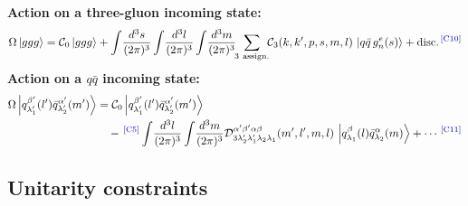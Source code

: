 \documentclass[11pt]{article}
\newcommand{\ip}[1]{\int\!\frac{d^{3}#1}{(2\pi)^{3}}}
\newcommand{\ket}[1]{\left|#1\right\rangle}
\newcommand{\OM}{\Omega}
\newcommand{\qk}[3]{q^{#1}_{#2}(#3)}
\newcommand{\aqk}[3]{\bar q^{#1}_{#2}(#3)}
\newcommand{\gl}[3]{g^{#1}_{#2}(#3)}
\newcommand{\C}{\mathcal{C}}
\newcommand{\D}{\mathcal{D}}
\newcommand{\chg}[1]{{\color{blue!70!black}\textsuperscript{\,[C#1]}}}
\begin{document}
\textbf{Action on a three-gluon incoming state:}
\begin{equation}
\OM\ket{ggg}=\C_{0}\ket{ggg}
+\ip{s}\ip{l}\ip{m}\!\!\sum_{\rm 3\ assign.}\!\!\C_{3}(k,k',p,s,m,l)\,
\ket{q\bar q\,\gl{e}{n}{s}}+\text{disc.}\chg{10}
\label{eq:Omggg}
\end{equation}
\textbf{Action on a $q\bar q$ incoming state:}
\begin{align}
\OM\ket{\qk{\beta'}{\lambda_{1}'}{l'}\aqk{\alpha'}{\lambda_{2}'}{m'}}
&=\C_{0}\ket{\qk{\beta'}{\lambda_{1}'}{l'}\aqk{\alpha'}{\lambda_{2}'}{m'}}
\nonumber\\
&\quad-\chg{5}\ip{l}\ip{m}
\D^{\alpha'\beta'\alpha\beta}_{3\lambda_{2}'\lambda_{1}'\lambda_{2}\lambda_{1}}(m',l',m,l)\,
\ket{\qk{\beta}{\lambda_{1}}{l}\aqk{\alpha}{\lambda_{2}}{m}}+\cdots\chg{11}
\label{eq:Omqq}
\end{align}

\subsection{Unitarity constraints}
\end{document}
